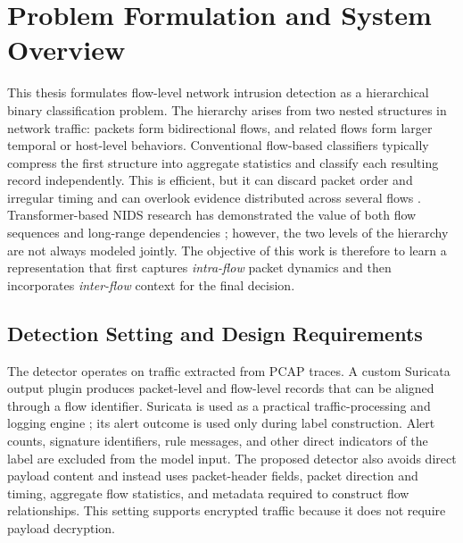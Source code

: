 
\section{Problem Formulation and System Overview}
\label{sec:problem_formulation}

This thesis formulates flow-level network intrusion detection as a hierarchical
binary classification problem. The hierarchy arises from two nested structures
in network traffic: packets form bidirectional flows, and related flows form
larger temporal or host-level behaviors. Conventional flow-based classifiers
typically compress the first structure into aggregate statistics and classify
each resulting record independently. This is efficient, but it can discard
packet order and irregular timing and can overlook evidence distributed across
several flows \cite{SommerPaxson2010,Han2023GTID,LiuPatras2022NetSentry}.
Transformer-based NIDS research has demonstrated the value of both flow
sequences and long-range dependencies
\cite{Manocchio2024FlowTransformer,MartinReizabal2026FlowWindow}; however, the
two levels of the hierarchy are not always modeled jointly. The objective of
this work is therefore to learn a representation that first captures
\emph{intra-flow} packet dynamics and then incorporates \emph{inter-flow}
context for the final decision.

\subsection{Detection Setting and Design Requirements}
\label{subsec:detection_setting}

The detector operates on traffic extracted from PCAP traces. A custom Suricata
output plugin produces packet-level and flow-level records that can be aligned
through a flow identifier. Suricata is used as a practical traffic-processing
and logging engine \cite{Roesch1999,SuricataGuide2026}; its alert outcome is
used only during label construction. Alert counts, signature identifiers, rule
messages, and other direct indicators of the label are excluded from the model
input. The proposed detector also avoids direct payload content and instead
uses packet-header fields, packet direction and timing, aggregate flow
statistics, and metadata required to construct flow relationships. This setting
supports encrypted traffic because it does not require payload decryption.

